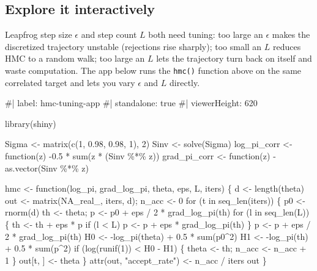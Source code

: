 \documentclass[
  letterpaper,
  DIV=11,
  numbers=noendperiod]{scrreprt}
\newenvironment{Shaded}{\begin{snugshade}}{\end{snugshade}}
\newcommand{\NormalTok}[1]{\textcolor[rgb]{0.00,0.23,0.31}{#1}}
\begin{document}
\subsection{Explore it interactively}\label{explore-it-interactively-3}

Leapfrog step size \(\epsilon\) and step count \(L\) both need tuning:
too large an \(\epsilon\) makes the discretized trajectory unstable
(rejections rise sharply); too small an \(L\) reduces HMC to a random
walk; too large an \(L\) lets the trajectory turn back on itself and
waste computation. The app below runs the \texttt{hmc()} function above
on the same correlated target and lets you vary \(\epsilon\) and \(L\)
directly.

\begin{Shaded}
\begin{Highlighting}[]
\NormalTok{\#| label: hmc{-}tuning{-}app}
\NormalTok{\#| standalone: true}
\NormalTok{\#| viewerHeight: 620}

\NormalTok{library(shiny)}

\NormalTok{Sigma \textless{}{-} matrix(c(1, 0.98, 0.98, 1), 2)}
\NormalTok{Sinv  \textless{}{-} solve(Sigma)}
\NormalTok{log\_pi\_corr  \textless{}{-} function(z) {-}0.5 * sum(z * (Sinv \%*\% z))}
\NormalTok{grad\_pi\_corr \textless{}{-} function(z) {-}as.vector(Sinv \%*\% z)}

\NormalTok{hmc \textless{}{-} function(log\_pi, grad\_log\_pi, theta, eps, L, iters) \{}
\NormalTok{    d \textless{}{-} length(theta)}
\NormalTok{    out \textless{}{-} matrix(NA\_real\_, iters, d); n\_acc \textless{}{-} 0}
\NormalTok{    for (t in seq\_len(iters)) \{}
\NormalTok{        p0 \textless{}{-} rnorm(d)}
\NormalTok{        th \textless{}{-} theta; p \textless{}{-} p0 + eps / 2 * grad\_log\_pi(th)}
\NormalTok{        for (l in seq\_len(L)) \{}
\NormalTok{            th \textless{}{-} th + eps * p}
\NormalTok{            if (l \textless{} L) p \textless{}{-} p + eps * grad\_log\_pi(th)}
\NormalTok{        \}}
\NormalTok{        p \textless{}{-} p + eps / 2 * grad\_log\_pi(th)}
\NormalTok{        H0 \textless{}{-} {-}log\_pi(theta) + 0.5 * sum(p0\^{}2)}
\NormalTok{        H1 \textless{}{-} {-}log\_pi(th)    + 0.5 * sum(p\^{}2)}
\NormalTok{        if (log(runif(1)) \textless{} H0 {-} H1) \{ theta \textless{}{-} th; n\_acc \textless{}{-} n\_acc + 1 \}}
\NormalTok{        out[t, ] \textless{}{-} theta}
\NormalTok{    \}}
\NormalTok{    attr(out, "accept\_rate") \textless{}{-} n\_acc / iters}
\NormalTok{    out}
\NormalTok{\}}


\end{Highlighting}
\end{Shaded}
\end{document}

